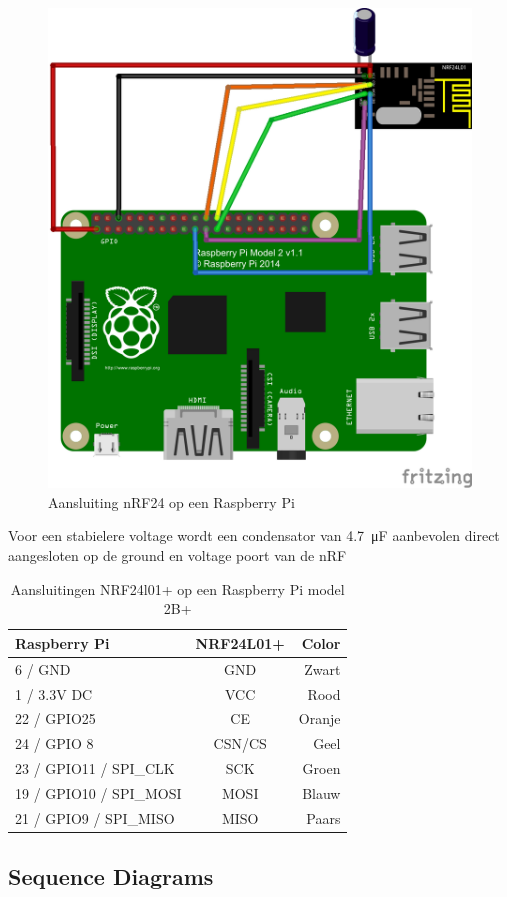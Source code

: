 \documentclass[a4paper, 11pt, oneside]{report}
\begin{document}
\begin{figure}[H]
	\begin{center}\includegraphics[width=.5\linewidth]{Afbeeldingen/fritzing_raspberry_nrf.png}\end{center}
	\caption{Aansluiting nRF24 op een Raspberry Pi}
	\label{fig:component:aansluting}
\end{figure}

Voor een stabielere voltage wordt een condensator van \SI{4.7}{\micro\farad} aanbevolen direct aangesloten op de ground en voltage poort van de nRF

\begin{table}[H]
	\centering
		\begin{tabular}{|l|c|r|}
			\hline
			\rowcolor[HTML]{C0C0C0} 
			Raspberry Pi & NRF24L01+ & Color \\ \hline
			6 / GND & GND & Zwart \\ \hline
			1 / 3.3V DC & VCC & Rood \\ \hline
			22 / GPIO25 & CE & Oranje \\ \hline
			24 / GPIO 8 & CSN/CS & Geel \\ \hline
			23 / GPIO11 / SPI\_CLK & SCK & Groen \\ \hline
			19 / GPIO10 / SPI\_MOSI & MOSI & Blauw \\ \hline
			21 / GPIO9 / SPI\_MISO & MISO & Paars \\ \hline
		\end{tabular}%
	\caption{Aansluitingen NRF24l01+ op een Raspberry Pi model 2B+}
	\label{tab:raspberry-nrf-aanslutingen}
\end{table}

\subsection{Sequence Diagrams}
\label{DetailedDesign:NRF24:sequence}
\end{document}
